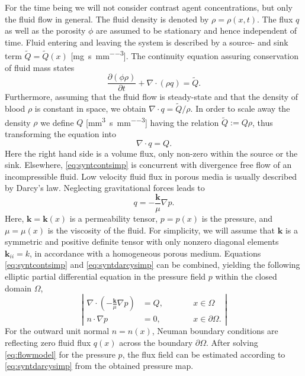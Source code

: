 \documentclass[journal,twocolumn]{IEEEtran}
\newcommand{\siQmm}{\milli\meter\cubed\per\second\per\milli\meter\cubed}
\newcommand{\siQtilde}{\milli\gram\per\second\per\milli\meter\cubed}
\begin{document}
	For the time being we will not consider contrast agent concentrations, but only the fluid flow in general.
	The fluid density is denoted by $\rho = \rho(x,t)$. 
	The flux $q$ as well as the porosity $\phi$ are assumed to be stationary and hence independent of time.
	Fluid entering and leaving the system is described by a source- and sink term $\tilde{Q} = \tilde{Q}(x)$ [\si{\siQtilde}]. 
	The continuity equation assuring conservation of fluid mass states
	\begin{equation}
		\frac{\partial (\phi \rho)}{\partial t} + \nabla \cdot (\rho q) = \tilde{Q}.
		\label{eq:syntcont}
	\end{equation} 
	Furthermore, assuming that the fluid flow is steady-state and that the density of blood $\rho$ is constant in space, we obtain $\nabla \cdot q = \tilde{Q}/\rho$.
	In order to scale away the density $\rho$ we define $Q$ [\si{\siQmm}] having the relation $\tilde{Q} := Q\rho$, thus transforming the equation into 
	\begin{equation}
		\nabla \cdot q = Q.
		\label{eq:syntcontsimp}
	\end{equation}
	Here the right hand side is a volume flux, only non-zero within the source or the sink. 
	Elsewhere, \eqref{eq:syntcontsimp} is concurrent with divergence free flow of an incompressible fluid.
	Low velocity fluid flux in porous media is usually described by Darcy's law. 	Neglecting gravitational forces leads to \cite{Darcy56}
	\begin{equation}
		q = -\frac{\mathbf{k}}{\mu} \nabla p.
		\label{eq:syntdarcysimp}
	\end{equation}
	Here, $\mathbf{k} = \mathbf{k}(x)$ is a permeability tensor, $p=p(x)$ is the pressure, and $\mu = \mu(x)$ is the viscosity of the fluid. 	
	For simplicity, we will assume that $\mathbf{k}$ is a symmetric and positive definite tensor with only nonzero diagonal elements $\mathbf{k}_{ii} = k$, in accordance with a homogeneous porous medium.	
	Equations \eqref{eq:syntcontsimp} and \eqref{eq:syntdarcysimp} can be combined, yielding the following elliptic partial differential equation in the pressure field $p$ within the closed domain $\Omega$,
	\begin{equation}
		\left\vert
		\begin{alignedat}{2}
			\nabla \cdot \left( -\frac{\mathbf{k}}{\mu} \nabla p \right) &= Q,  \qquad &&x \in \Omega \\
			n \cdot \nabla p &=0, &&x \in \partial \Omega.
		\end{alignedat}
		\right\vert 
		\label{eq:flowmodel}
	\end{equation}
	For the outward unit normal $n=n(x)$, Neuman boundary conditions are reflecting zero fluid flux $q(x)$ across the boundary $\partial \Omega$.
	After solving \eqref{eq:flowmodel} for the pressure $p$, the flux field can be estimated according to \eqref{eq:syntdarcysimp} from the obtained pressure map. 
	
\end{document}
